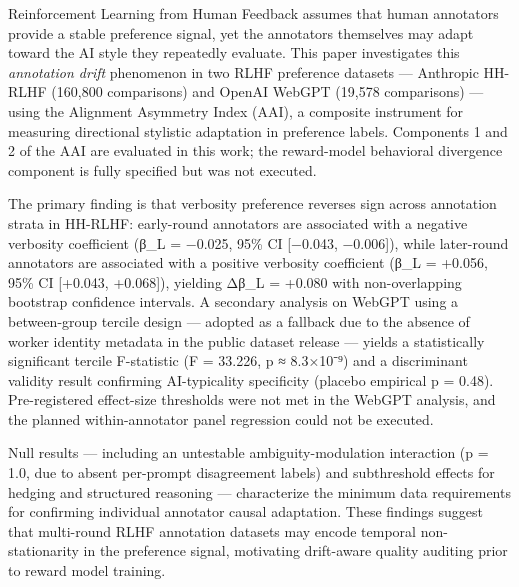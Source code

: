 
Reinforcement Learning from Human Feedback assumes that human annotators provide a stable preference signal, yet the annotators themselves may adapt toward the AI style they repeatedly evaluate. This paper investigates this \textit{annotation drift} phenomenon in two RLHF preference datasets — Anthropic HH-RLHF (160,800 comparisons) and OpenAI WebGPT (19,578 comparisons) — using the Alignment Asymmetry Index (AAI), a composite instrument for measuring directional stylistic adaptation in preference labels. Components 1 and 2 of the AAI are evaluated in this work; the reward-model behavioral divergence component is fully specified but was not executed.

The primary finding is that verbosity preference reverses sign across annotation strata in HH-RLHF: early-round annotators are associated with a negative verbosity coefficient (β_L = −0.025, 95\% CI [−0.043, −0.006]), while later-round annotators are associated with a positive verbosity coefficient (β_L = +0.056, 95\% CI [+0.043, +0.068]), yielding Δβ_L = +0.080 with non-overlapping bootstrap confidence intervals. A secondary analysis on WebGPT using a between-group tercile design — adopted as a fallback due to the absence of worker identity metadata in the public dataset release — yields a statistically significant tercile F-statistic (F = 33.226, p ≈ 8.3×10⁻⁹) and a discriminant validity result confirming AI-typicality specificity (placebo empirical p = 0.48). Pre-registered effect-size thresholds were not met in the WebGPT analysis, and the planned within-annotator panel regression could not be executed.

Null results — including an untestable ambiguity-modulation interaction (p = 1.0, due to absent per-prompt disagreement labels) and subthreshold effects for hedging and structured reasoning — characterize the minimum data requirements for confirming individual annotator causal adaptation. These findings suggest that multi-round RLHF annotation datasets may encode temporal non-stationarity in the preference signal, motivating drift-aware quality auditing prior to reward model training.

